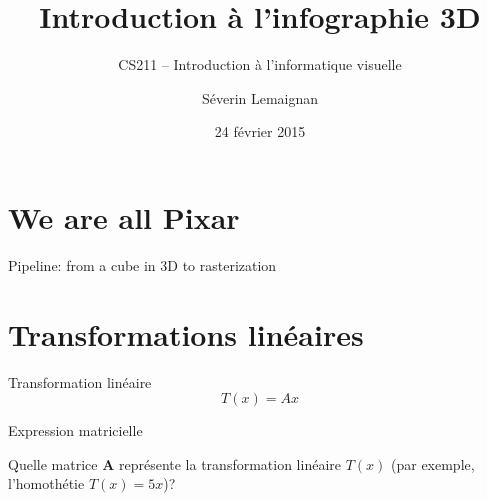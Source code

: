 \documentclass[compress]{beamer}
\title{Introduction à l'infographie 3D}
\subtitle{CS211 -- Introduction à l'informatique visuelle}
\date{24 février 2015}
\author{Séverin Lemaignan}
\institute{Computer-Human Interaction\\for Learning and Instruction {\Medium
EPFL}}
\begin{document}
\maketitle


\section{We are all Pixar}



\begin{frame}{}

    Pipeline: from a cube in 3D to rasterization
\end{frame}


\section[Transformations]{Transformations linéaires}

\begin{frame}{Transformation linéaire}
\Large
\[
    T(x) = Ax
\]
\end{frame}

\begin{frame}{Expression matricielle}

Quelle matrice $\mathbf{A}$ représente la transformation linéaire $T(x)$
(par exemple, l'homothétie $T(x) = 5x$)?


\end{frame}
\end{document}
